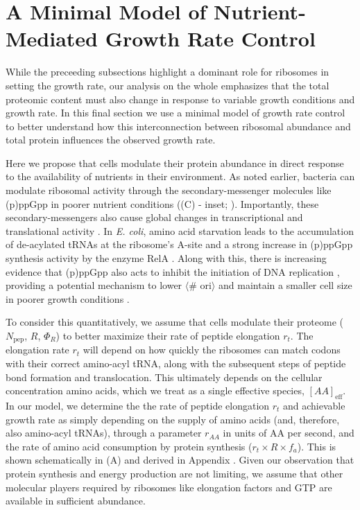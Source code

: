 \section{A Minimal Model of Nutrient-Mediated Growth Rate Control}
While the preceeding subsections highlight a dominant role for ribosomes in
setting the growth rate, our analysis on the whole emphasizes that the total
proteomic content must also change in response to variable growth conditions and
growth rate. In this final section we use a minimal model of growth rate control
to better understand how this interconnection between ribosomal abundance and
total protein influences the observed growth rate.

Here we propose that cells modulate their protein abundance in direct response
to the availability of nutrients in their environment. As noted earlier,
bacteria can modulate ribosomal activity through the secondary-messenger
molecules like (p)ppGpp in poorer nutrient conditions ((C) -
inset; \cite{dai2016}). Importantly, these secondary-messengers also cause
global changes in transcriptional and translational activity
\citep{hauryliuk2015, zhu2019, Buke2020}. In \textit{E. coli}, amino acid
starvation leads to the accumulation of de-acylated tRNAs at the ribosome's
A-site and a strong increase in (p)ppGpp synthesis activity by the enzyme RelA
\citep{hauryliuk2015}. Along with this,  there is increasing evidence that
(p)ppGpp also acts to inhibit the initiation of DNA replication
\citep{kraemer2019}, providing a potential mechanism to lower $\langle$\#
ori$\rangle$ and maintain a smaller cell size in poorer growth conditions
\citep{fernandezcoll2020}.

To consider this quantitatively, we assume that cells modulate their proteome
($N_\text{pep}$, $R$, $\Phi_R$) to better maximize their rate of peptide
elongation $r_t$. The elongation rate $r_t$ will depend on how quickly the ribosomes can
match codons with their correct amino-acyl tRNA, along with the subsequent steps
of peptide bond formation and translocation. This ultimately depends on the
cellular concentration amino acids, which we treat as a single effective
species, $[AA]_\text{eff}$. In our model, we determine the the rate of peptide
elongation $r_t$ and achievable growth rate as simply depending on the supply of
amino acids (and, therefore, also amino-acyl tRNAs), through a parameter
$r_{AA}$ in units of AA per second, and the rate of amino acid consumption by
protein synthesis ($r_t \times R \times f_a$). This is shown schematically in
(A) and derived in Appendix . Given our observation
that protein synthesis and energy production are not limiting, we
assume that other molecular players required by ribosomes like elongation
factors and GTP are available in sufficient abundance.

